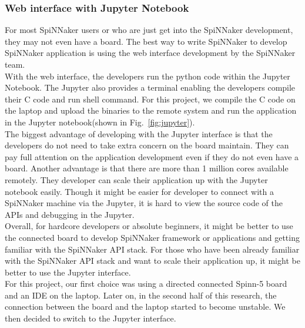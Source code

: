 \subsubsection{Web interface with Jupyter Notebook}
For most SpiNNaker users or who are just get into the SpiNNaker development, they may not even have a board. The best way to write SpiNNaker to develop SpiNNaker application is using the web interface development by the SpiNNaker team. \\

With the web interface, the developers run the python code within the Jupyter Notebook. The Jupyter also provides a terminal enabling the developers compile their C code and run shell command. For this project, we compile the C code on the laptop and upload the binaries to the remote system and run the application in the Jupyter notebook(shown in Fig.~\ref{fig:jupyter}).\\

The biggest advantage of developing with the Jupyter interface is that the developers do not need to take extra concern on the board maintain. They can pay full attention on the application development even if they do not even have a board. Another advantage is that there are more than 1 million cores available remotely. They developer can scale their application up with the Jupyter notebook easily. Though it might be easier for developer to connect with a SpiNNaker machine via the Jupyter, it is hard to view the source code of the APIs and debugging in the Jupyter. \\

Overall, for hardcore developers or absolute beginners, it might be better to use the connected board to develop SpiNNaker framework or applications and getting familiar with the SpiNNaker API stack. For those who have been already familiar with the SpiNNaker API stack and want to scale their application up, it might be better to use the Jupyter interface.\\

For this project, our first choice was using a directed connected Spinn-5 board and an IDE on the laptop. Later on, in the second half of this research, the connection between the board and the laptop started to become unstable. We then decided to switch to the Jupyter interface.\\

